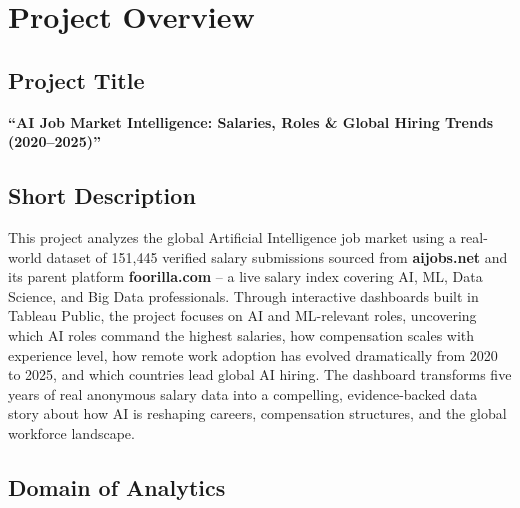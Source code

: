 \documentclass[12pt,a4paper]{article}
\begin{document}
\newpage
\thispagestyle{fancy}
\tableofcontents
\newpage

\section{Project Overview}

\subsection{Project Title}
\begin{storybox}
\centering
{\large\bfseries\color{fastblue}
``AI Job Market Intelligence: Salaries, Roles \& Global Hiring Trends (2020--2025)''}
\end{storybox}

\subsection{Short Description}

This project analyzes the global Artificial Intelligence job market using a real-world
dataset of 151{,}445 verified salary submissions sourced from \textbf{aijobs.net} and
its parent platform \textbf{foorilla.com} -- a live salary index covering AI, ML,
Data Science, and Big Data professionals. Through interactive dashboards built in
Tableau Public, the project focuses on AI and ML-relevant roles, uncovering which AI roles command the highest salaries, how
compensation scales with experience level, how remote work adoption has evolved
dramatically from 2020 to 2025, and which countries lead global AI hiring. The
dashboard transforms five years of real anonymous salary data into a compelling,
evidence-backed data story about how AI is reshaping careers, compensation structures,
and the global workforce landscape.

\subsection{Domain of Analytics}
\end{document}
